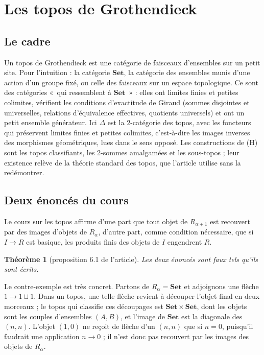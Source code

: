 \documentclass[11pt,a4paper]{amsart}
\theoremstyle{definition}
\theoremstyle{plain}
\newtheorem{theoreme}{Théorème}
\theoremstyle{remark}
\newcommand{\Set}{\mathbf{Set}}
\begin{document}
\section{Les topos de Grothendieck}

\subsection{Le cadre}

Un topos de Grothendieck est une catégorie de faisceaux d'ensembles sur un petit site. Pour l'intuition : la catégorie $\Set$, la catégorie des ensembles munis d'une action d'un groupe fixé, ou celle des faisceaux sur un espace topologique. Ce sont des catégories «~qui ressemblent à $\Set$~» : elles ont limites finies et petites colimites, vérifient les conditions d'exactitude de Giraud (sommes disjointes et universelles, relations d'équivalence effectives, quotients universels) et ont un petit ensemble générateur. Ici $\Delta$ est la 2-catégorie des topos, avec les foncteurs qui préservent limites finies et petites colimites, c'est-à-dire les images inverses des morphismes géométriques, lues dans le sens opposé. Les constructions de (H) sont les topos classifiants, les 2-sommes amalgamées et les sous-topos ; leur existence relève de la théorie standard des topos, que l'article utilise sans la redémontrer.

\subsection{Deux énoncés du cours}

Le cours sur les topos affirme d'une part que tout objet de $R_{\alpha+1}$ est recouvert par des images d'objets de $R_\alpha$, d'autre part, comme condition nécessaire, que si $I\to R$ est basique, les produits finis des objets de $I$ engendrent $R$.

\begin{theoreme}[proposition 6.1 de l'article]
Les deux énoncés sont faux tels qu'ils sont écrits.
\end{theoreme}

Le contre-exemple est très concret. Partons de $R_\alpha=\Set$ et adjoignons une flèche $1\to1\sqcup1$. Dans un topos, une telle flèche revient à découper l'objet final en deux morceaux ; le topos qui classifie ces découpages est $\Set\times\Set$, dont les objets sont les couples d'ensembles $(A,B)$, et l'image de $\Set$ est la diagonale des $(n,n)$. L'objet $(1,0)$ ne reçoit de flèche d'un $(n,n)$ que si $n=0$, puisqu'il faudrait une application $n\to0$ ; il n'est donc pas recouvert par les images des objets de $R_\alpha$.
\end{document}

